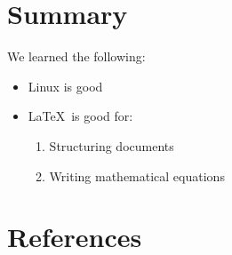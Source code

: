 \documentclass[a4paper,12pt,twoside]{article}
\begin{document}
\section{Summary}
\label{sec:sum}
We learned the following:
\begin{itemize}
  \item Linux is good
  \item \LaTeX\ is good for:
    \begin{enumerate}
      \item Structuring documents
      \item Writing mathematical equations
    \end{enumerate}
\end{itemize}

\section{References} %
\nocite{*}
\begingroup
\renewcommand{\section}[2]{} %

\endgroup

\end{document}
